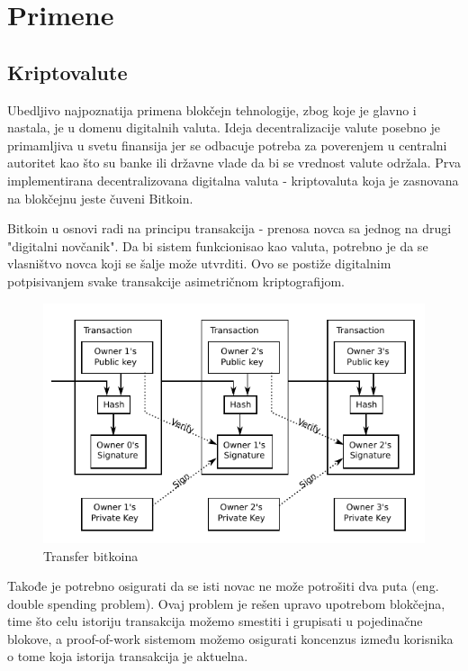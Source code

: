 \documentclass[a4paper]{article}
\begin{document}
{\section{Primene}
\label{sec:primene}

\subsection{Kriptovalute}
Ubedljivo najpoznatija primena blokčejn tehnologije, zbog koje je glavno i nastala, je u domenu digitalnih valuta.
Ideja decentralizacije valute posebno je primamljiva u svetu finansija jer se odbacuje potreba za poverenjem
u centralni autoritet kao što su banke ili državne vlade da bi se vrednost valute održala. 
Prva implementirana decentralizovana digitalna valuta - kriptovaluta koja je zasnovana na blokčejnu jeste čuveni Bitkoin.

Bitkoin u osnovi radi na principu transakcija - prenosa novca sa jednog na drugi "digitalni novčanik". Da bi sistem funkcionisao
kao valuta, potrebno je da se vlasništvo novca koji se šalje može utvrditi. Ovo se postiže digitalnim potpisivanjem svake transakcije
asimetričnom kriptografijom.

\begin{figure}[H]
    \centering
        \includegraphics[scale=0.8]{Bitcoin_Transaction_Visual.pdf}
    \caption{Transfer bitkoina}
    \label{fig:btc_transfer}
\end{figure}

Takođe je potrebno osigurati da se isti novac ne može potrošiti dva puta (eng. double spending problem).
Ovaj problem je rešen upravo upotrebom blokčejna, time što celu istoriju transakcija možemo smestiti i grupisati u pojedinačne blokove, a
proof-of-work sistemom možemo osigurati koncenzus između korisnika o tome koja istorija transakcija je aktuelna. 

}
\end{document}
